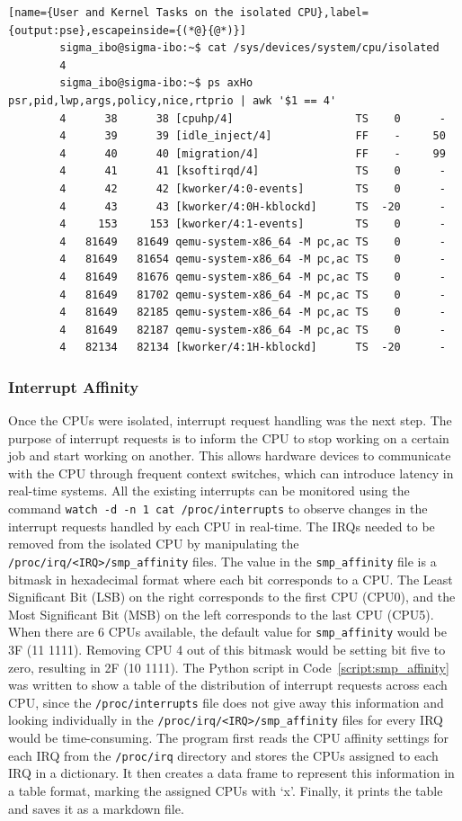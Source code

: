 \documentclass[MMR,Master,english]{style/twbook}
\begin{document}
\vspace{2em}
\begin{lstlisting}[name={User and Kernel Tasks on the isolated CPU},label={output:pse},escapeinside={(*@}{@*)}]
		sigma_ibo@sigma-ibo:~$ cat /sys/devices/system/cpu/isolated
		4
		sigma_ibo@sigma-ibo:~$ ps axHo psr,pid,lwp,args,policy,nice,rtprio | awk '$1 == 4'
		4      38      38 [cpuhp/4]                   TS    0      -
		4      39      39 [idle_inject/4]             FF    -     50
		4      40      40 [migration/4]               FF    -     99
		4      41      41 [ksoftirqd/4]               TS    0      -
		4      42      42 [kworker/4:0-events]        TS    0      -
		4      43      43 [kworker/4:0H-kblockd]      TS  -20      -
		4     153     153 [kworker/4:1-events]        TS    0      -
		4   81649   81649 qemu-system-x86_64 -M pc,ac TS    0      -
		4   81649   81654 qemu-system-x86_64 -M pc,ac TS    0      -
		4   81649   81676 qemu-system-x86_64 -M pc,ac TS    0      -
		4   81649   81702 qemu-system-x86_64 -M pc,ac TS    0      -
		4   81649   82185 qemu-system-x86_64 -M pc,ac TS    0      -
		4   81649   82187 qemu-system-x86_64 -M pc,ac TS    0      -
		4   82134   82134 [kworker/4:1H-kblockd]      TS  -20      -
\end{lstlisting}

\subsubsection{Interrupt Affinity}\label{subsubsec:irq_handling}
Once the CPUs were isolated, interrupt request handling was the next step. The purpose of interrupt requests is to inform the CPU to stop working on a certain job and start working on another. This allows hardware devices to communicate with the CPU through frequent context switches, which can introduce latency in real-time systems. All the existing interrupts can be monitored using the command \texttt{watch -d -n 1 cat /proc/interrupts} to observe changes in the interrupt requests handled by each CPU in real-time. The IRQs needed to be removed from the isolated CPU by manipulating the \texttt{/proc/irq/<IRQ>/smp\_affinity} files. The value in the \texttt{smp\_affinity} file is a bitmask in hexadecimal format where each bit corresponds to a CPU. The Least Significant Bit (LSB) on the right corresponds to the first CPU (CPU0), and the Most Significant Bit (MSB) on the left corresponds to the last CPU (CPU5). When there are 6 CPUs available, the default value for \texttt{smp\_affinity} would be 3F (11 1111). Removing CPU 4 out of this bitmask would be setting bit five to zero, resulting in 2F (10 1111). The Python script in Code~\ref{script:smp_affinity} was written to show a table of the distribution of interrupt requests across each CPU, since the \texttt{/proc/interrupts} file does not give away this information and looking individually in the \texttt{/proc/irq/<IRQ>/smp\_affinity} files for every IRQ would be time-consuming. The program first reads the CPU affinity settings for each IRQ from the \texttt{/proc/irq} directory and stores the CPUs assigned to each IRQ in a dictionary. It then creates a data frame to represent this information in a table format, marking the assigned CPUs with ‘x'. Finally, it prints the table and saves it as a markdown file.
\end{document}
